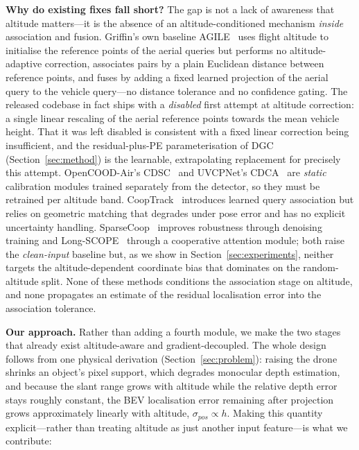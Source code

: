 \documentclass[9.5pt,twocolumn,a4paper]{IEEEtran}
\begin{document}
\noindent\textbf{Why do existing fixes fall short?} The gap is not a lack of awareness that altitude matters---it is the absence of an altitude-conditioned mechanism \emph{inside} association and fusion. Griffin's own baseline AGILE~\cite{griffin} uses flight altitude to initialise the reference points of the aerial queries but performs no altitude-adaptive correction, associates pairs by a plain Euclidean distance between reference points, and fuses by adding a fixed learned projection of the aerial query to the vehicle query---no distance tolerance and no confidence gating. The released codebase in fact ships with a \emph{disabled} first attempt at altitude correction: a single linear rescaling of the aerial reference points towards the mean vehicle height. That it was left disabled is consistent with a fixed linear correction being insufficient, and the residual-plus-PE parameterisation of DGC (Section~\ref{sec:method}) is the learnable, extrapolating replacement for precisely this attempt. OpenCOOD-Air's CDSC~\cite{opencood_air} and UVCPNet's CDCA~\cite{uvcpnet} are \emph{static} calibration modules trained separately from the detector, so they must be retrained per altitude band. CoopTrack~\cite{cooptrack} introduces learned query association but relies on geometric matching that degrades under pose error and has no explicit uncertainty handling. SparseCoop~\cite{sparsecoop} improves robustness through denoising training and Long-SCOPE~\cite{longscope} through a cooperative attention module; both raise the \emph{clean-input} baseline but, as we show in Section~\ref{sec:experiments}, neither targets the altitude-dependent coordinate bias that dominates on the random-altitude split. None of these methods conditions the association stage on altitude, and none propagates an estimate of the residual localisation error into the association tolerance.

\noindent\textbf{Our approach.} Rather than adding a fourth module, we make the two stages that already exist altitude-aware and gradient-decoupled. The whole design follows from one physical derivation (Section~\ref{sec:problem}): raising the drone shrinks an object's pixel support, which degrades monocular depth estimation, and because the slant range grows with altitude while the relative depth error stays roughly constant, the BEV localisation error remaining after projection grows approximately linearly with altitude, $\sigma_{pos} \propto h$. Making this quantity explicit---rather than treating altitude as just another input feature---is what we contribute:
\end{document}
